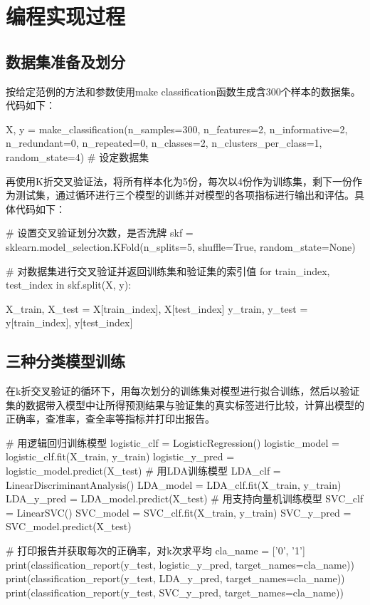\documentclass{ctexart}
\begin{document}
\section{编程实现过程}
\subsection{数据集准备及划分}
按给定范例的方法和参数使用make classification函数生成含300个样本的数据集。
代码如下：
\begin{python}
X, y = make_classification(n_samples=300, 
n_features=2, n_informative=2, n_redundant=0, n_repeated=0, 
n_classes=2, n_clusters_per_class=1, random_state=4)  # 设定数据集
\end{python}
\vfill
再使用K折交叉验证法，将所有样本化为5份，每次以4份作为训练集，剩下一份作为测试集，通过循环进行三个模型的训练并对模型的各项指标进行输出和评估。具体代码如下：
\begin{python}
 # 设置交叉验证划分次数，是否洗牌
skf = sklearn.model_selection.KFold(n_splits=5, shuffle=True, random_state=None) 

 # 对数据集进行交叉验证并返回训练集和验证集的索引值
for train_index, test_index in skf.split(X, y): 

    X_train, X_test = X[train_index], X[test_index]
    y_train, y_test = y[train_index], y[test_index]
\end{python}
\vfill
\subsection{三种分类模型训练}
在k折交叉验证的循环下，用每次划分的训练集对模型进行拟合训练，然后以验证集的数据带入模型中让所得预测结果与验证集的真实标签进行比较，计算出模型的正确率，查准率，查全率等指标并打印出报告。

\begin{python}
    # 用逻辑回归训练模型
    logistic_clf = LogisticRegression()
    logistic_model = logistic_clf.fit(X_train, y_train)
    logistic_y_pred = logistic_model.predict(X_test)
    # 用LDA训练模型
    LDA_clf = LinearDiscriminantAnalysis()
    LDA_model = LDA_clf.fit(X_train, y_train)
    LDA_y_pred = LDA_model.predict(X_test)
    # 用支持向量机训练模型
    SVC_clf = LinearSVC()
    SVC_model = SVC_clf.fit(X_train, y_train)
    SVC_y_pred = SVC_model.predict(X_test)

    # 打印报告并获取每次的正确率，对k次求平均
    cla_name = ['0', '1']
    print(classification_report(y_test, logistic_y_pred, target_names=cla_name))
    print(classification_report(y_test, LDA_y_pred, target_names=cla_name))
    print(classification_report(y_test, SVC_y_pred, target_names=cla_name))
\end{python}
\end{document}
